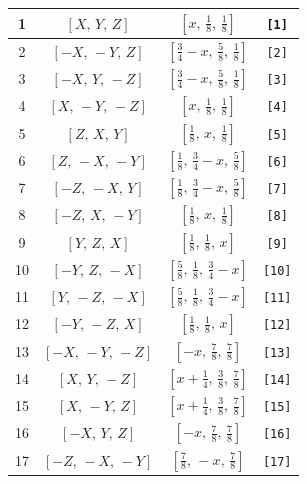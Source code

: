 \documentclass[fleqn,8pt]{jsarticle}
\begin{document}
\begin{longtable}{cccc}
1 & $\left[ X,\, Y,\, Z \right]$ & $\left[ x,\, \frac{1}{8},\, \frac{1}{8} \right]$ & {\tt [1]} \\ \hline
2 & $\left[ - X,\, - Y,\, Z \right]$ & $\left[ \frac{3}{4} - x,\, \frac{5}{8},\, \frac{1}{8} \right]$ & {\tt [2]} \\ \hline
3 & $\left[ - X,\, Y,\, - Z \right]$ & $\left[ \frac{3}{4} - x,\, \frac{5}{8},\, \frac{1}{8} \right]$ & {\tt [3]} \\ \hline
4 & $\left[ X,\, - Y,\, - Z \right]$ & $\left[ x,\, \frac{1}{8},\, \frac{1}{8} \right]$ & {\tt [4]} \\ \hline
5 & $\left[ Z,\, X,\, Y \right]$ & $\left[ \frac{1}{8},\, x,\, \frac{1}{8} \right]$ & {\tt [5]} \\ \hline
6 & $\left[ Z,\, - X,\, - Y \right]$ & $\left[ \frac{1}{8},\, \frac{3}{4} - x,\, \frac{5}{8} \right]$ & {\tt [6]} \\ \hline
7 & $\left[ - Z,\, - X,\, Y \right]$ & $\left[ \frac{1}{8},\, \frac{3}{4} - x,\, \frac{5}{8} \right]$ & {\tt [7]} \\ \hline
8 & $\left[ - Z,\, X,\, - Y \right]$ & $\left[ \frac{1}{8},\, x,\, \frac{1}{8} \right]$ & {\tt [8]} \\ \hline
9 & $\left[ Y,\, Z,\, X \right]$ & $\left[ \frac{1}{8},\, \frac{1}{8},\, x \right]$ & {\tt [9]} \\ \hline
10 & $\left[ - Y,\, Z,\, - X \right]$ & $\left[ \frac{5}{8},\, \frac{1}{8},\, \frac{3}{4} - x \right]$ & {\tt [10]} \\ \hline
11 & $\left[ Y,\, - Z,\, - X \right]$ & $\left[ \frac{5}{8},\, \frac{1}{8},\, \frac{3}{4} - x \right]$ & {\tt [11]} \\ \hline
12 & $\left[ - Y,\, - Z,\, X \right]$ & $\left[ \frac{1}{8},\, \frac{1}{8},\, x \right]$ & {\tt [12]} \\ \hline
13 & $\left[ - X,\, - Y,\, - Z \right]$ & $\left[ - x,\, \frac{7}{8},\, \frac{7}{8} \right]$ & {\tt [13]} \\ \hline
14 & $\left[ X,\, Y,\, - Z \right]$ & $\left[ x + \frac{1}{4},\, \frac{3}{8},\, \frac{7}{8} \right]$ & {\tt [14]} \\ \hline
15 & $\left[ X,\, - Y,\, Z \right]$ & $\left[ x + \frac{1}{4},\, \frac{3}{8},\, \frac{7}{8} \right]$ & {\tt [15]} \\ \hline
16 & $\left[ - X,\, Y,\, Z \right]$ & $\left[ - x,\, \frac{7}{8},\, \frac{7}{8} \right]$ & {\tt [16]} \\ \hline
17 & $\left[ - Z,\, - X,\, - Y \right]$ & $\left[ \frac{7}{8},\, - x,\, \frac{7}{8} \right]$ & {\tt [17]} \\ \hline

\end{longtable}
\end{document}
